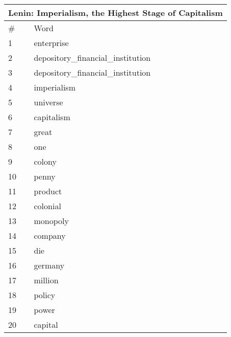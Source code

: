 
    \begin{center}
      \begin{tabular}{ | l | l | }
        \hline
        \multicolumn{2}{|c|}{Lenin: Imperialism, the Highest Stage of Capitalism} \\ \hline
        \# & Word  \\ \hline
1 & enterprise \\ \hline 
2 & depository_financial_institution \\ \hline 
3 & depository_financial_institution \\ \hline 
4 & imperialism \\ \hline 
5 & universe \\ \hline 
6 & capitalism \\ \hline 
7 & great \\ \hline 
8 & one \\ \hline 
9 & colony \\ \hline 
10 & penny \\ \hline 
11 & product \\ \hline 
12 & colonial \\ \hline 
13 & monopoly \\ \hline 
14 & company \\ \hline 
15 & die \\ \hline 
16 & germany \\ \hline 
17 & million \\ \hline 
18 & policy \\ \hline 
19 & power \\ \hline 
20 & capital \\ \hline 

      \end{tabular}
    \end{center}
            